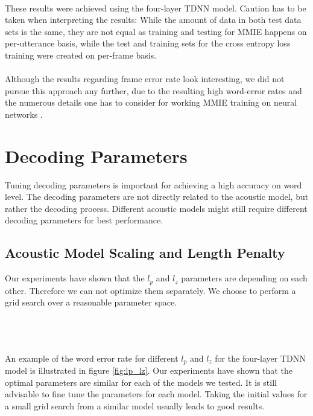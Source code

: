 \fi
\\ These results were achieved using the four-layer TDNN model. Caution has to be taken when interpreting the results: While the amount of data in both test data sets is the same, they are not equal as training and testing for MMIE happens on per-utterance basis, while the test and training sets for the cross entropy loss training were created on per-frame basis. \\ \\
Although the results regarding frame error rate look interesting, we did not pursue this approach any further, due to the resulting high word-error rates and the numerous details one has to consider for working MMIE training on neural networks \cite{su2013error}.

\section{Decoding Parameters}
Tuning decoding parameters is important for achieving a high accuracy on word level. The decoding parameters are not directly related to the acoustic model, but rather the decoding process. Different acoustic models might still require different decoding parameters for best performance. 
\subsection{Acoustic Model Scaling and Length Penalty}
Our experiments have shown that the $l_p$ and $l_z$ parameters are depending on each other. Therefore we can not optimize them separately. We choose to perform a grid search over a reasonable parameter space. \\ \\
\begin{minipage}{\linewidth}
\centering
{}
\label{fig:lp_lz}
\end{minipage}
\\ \\
An example of the word error rate for different $l_p$ and $l_z$ for the four-layer TDNN model is illustrated in figure \ref{fig:lp_lz}. Our experiments have shown that the optimal parameters are similar for each of the models we tested. It is still advisable to fine tune the parameters for each model. Taking the initial values for a small grid search from a similar model usually leads to good results.
